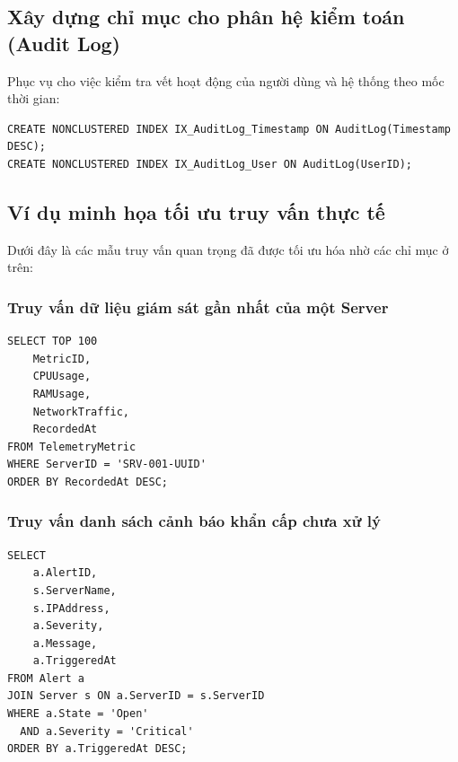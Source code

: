 \subsection{Xây dựng chỉ mục cho phân hệ kiểm toán (Audit Log)}
Phục vụ cho việc kiểm tra vết hoạt động của người dùng và hệ thống theo mốc thời gian:

\begin{verbatim}
CREATE NONCLUSTERED INDEX IX_AuditLog_Timestamp ON AuditLog(Timestamp DESC);
CREATE NONCLUSTERED INDEX IX_AuditLog_User ON AuditLog(UserID);
\end{verbatim}

\subsection{Ví dụ minh họa tối ưu truy vấn thực tế}
Dưới đây là các mẫu truy vấn quan trọng đã được tối ưu hóa nhờ các chỉ mục ở trên:

\subsubsection{Truy vấn dữ liệu giám sát gần nhất của một Server}
\begin{verbatim}
SELECT TOP 100 
    MetricID,
    CPUUsage,
    RAMUsage,
    NetworkTraffic,
    RecordedAt
FROM TelemetryMetric
WHERE ServerID = 'SRV-001-UUID'
ORDER BY RecordedAt DESC;
\end{verbatim}

\subsubsection{Truy vấn danh sách cảnh báo khẩn cấp chưa xử lý}
\begin{verbatim}
SELECT 
    a.AlertID,
    s.ServerName,
    s.IPAddress,
    a.Severity,
    a.Message,
    a.TriggeredAt
FROM Alert a
JOIN Server s ON a.ServerID = s.ServerID
WHERE a.State = 'Open' 
  AND a.Severity = 'Critical'
ORDER BY a.TriggeredAt DESC;
\end{verbatim}
